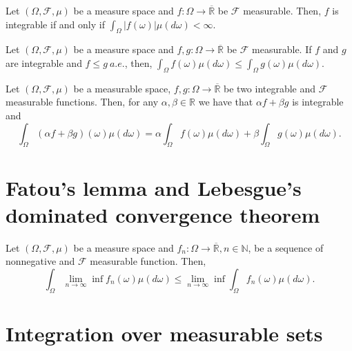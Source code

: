 \begin{proposition}
    \label{prop:8.6}
    Let $(\Omega, \mathcal{F}, \mu)$ be a measure space  and $f: \Omega\to \overline{\mathbb{R}}$ be 
    $\mathcal{F}$ measurable. Then, $f$ is integrable if and only if
    $\int_{\Omega} \lvert f(\omega) \rvert \mu(d\omega) < \infty$.
\end{proposition}

\begin{proposition}
    \label{prop:8.7}
    Let $(\Omega, \mathcal{F}, \mu)$ be a measure space and $f, g: \Omega \to \overline{\mathbb{R}}$ 
    be $\mathcal{F}$ measurable. If $f$ and $g$ are integrable and $f\le g \ a.e.$, then,
    $\int_{\Omega} f(\omega)\mu(d\omega) \le \int_{\Omega}g(\omega)\mu(d\omega)$.
\end{proposition}

\begin{proposition}
    \label{prop:8.8}
    Let $(\Omega, \mathcal{F}, \mu)$ be a measurable space, $f, g: \Omega \to \overline{\mathbb{R}}$
    be two integrable and $\mathcal{F}$ measurable functions. Then, for any $\alpha, \beta \in \mathbb{R}$ 
    we have that $\alpha f + \beta g$ is integrable and
    \[
    \int_{\Omega} (\alpha f + \beta g)(\omega)\mu(d\omega) =
    \alpha \int_{\Omega} f(\omega)\mu(d\omega) + \beta \int_{\Omega} g(\omega)\mu(d\omega)
    .\] 
\end{proposition}


\section{Fatou's lemma and Lebesgue's dominated convergence theorem}%
\label{sec:Fatou's lemma and Lebesgue's dominated convergence theorem}

\begin{proposition}
    \label{prop:8.9}
    Let $(\Omega, \mathcal{F}, \mu)$ be a measure space and $f_n: \Omega \to \overline{\mathbb{R}},
    n \in \mathbb{N}$, be a sequence of nonnegative and $\mathcal{F}$ measurable function. Then,
    \[
    \int_{\Omega} \lim_{n \to \infty} \inf f_n(\omega)\mu(d\omega) \le 
    \lim_{n \to \infty} \inf \int_{\Omega} f_n(\omega)\mu(d\omega)
    .\] 
\end{proposition}

\section{Integration over measurable sets}%
\label{sec:Integration over measurable sets}

